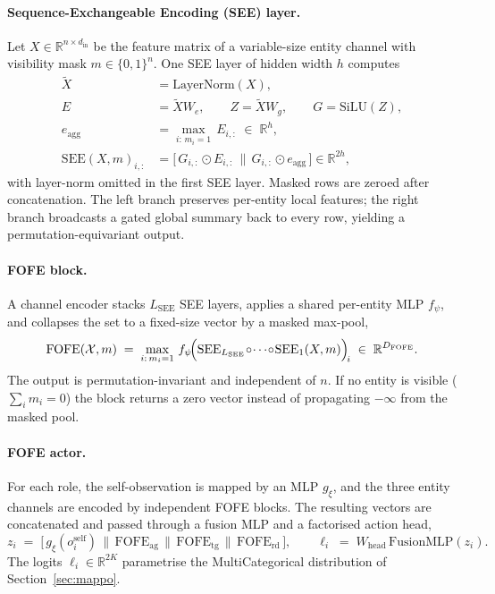 \paragraph{Sequence-Exchangeable Encoding (SEE) layer.}
Let $X\in\mathbb{R}^{n\times d_{\mathrm{in}}}$ be the feature matrix of a
variable-size entity channel with visibility mask
$m\in\{0,1\}^{n}$. One SEE layer of hidden width $h$ computes
\begin{align}
\tilde X &= \mathrm{LayerNorm}(X), \label{eq:see_ln}\\
E &= \tilde X W_e,\qquad Z = \tilde X W_g,\qquad G = \mathrm{SiLU}(Z), \label{eq:see_proj}\\
e_{\mathrm{agg}} &= \max_{i:\,m_i=1}\, E_{i,:}\;\in\;\mathbb{R}^{h}, \label{eq:see_pool}\\
\mathrm{SEE}(X,m)_{i,:} &=
\bigl[\, G_{i,:}\odot E_{i,:}\,\|\,G_{i,:}\odot e_{\mathrm{agg}}\,\bigr]
\in\mathbb{R}^{2h}, \label{eq:see_cat}
\end{align}
with layer-norm omitted in the first SEE layer. Masked rows are zeroed after
concatenation. The left branch preserves per-entity local features; the
right branch broadcasts a gated global summary back to every row, yielding a
permutation-equivariant output.

\paragraph{FOFE block.}
A channel encoder stacks $L_{\mathrm{SEE}}$ SEE layers, applies a shared
per-entity MLP $f_\psi$, and collapses the set to a fixed-size vector by a
masked max-pool,
\begin{equation}
\mathrm{FOFE}(\mathcal{X},m) \;=\;
\max_{i:\,m_i=1}\, f_\psi\!\Bigl(\mathrm{SEE}_{L_{\mathrm{SEE}}}\!\circ\!\cdots\!\circ\!\mathrm{SEE}_{1}(X,m)\Bigr)_{\!i}
\;\in\;\mathbb{R}^{D_{\mathrm{FOFE}}}.
\label{eq:fofe}
\end{equation}
The output is permutation-invariant and independent of $n$. If no entity is
visible ($\sum_i m_i = 0$) the block returns a zero vector instead of
propagating $-\infty$ from the masked pool.

\paragraph{FOFE actor.}
For each role, the self-observation is mapped by an MLP $g_\xi$, and the
three entity channels are encoded by independent FOFE blocks. The resulting
vectors are concatenated and passed through a fusion MLP and a factorised
action head,
\begin{equation}
z_i \;=\; \bigl[\, g_\xi(o_i^{\mathrm{self}})\,\|\,
\mathrm{FOFE}_{\mathrm{ag}}\,\|\,
\mathrm{FOFE}_{\mathrm{tg}}\,\|\,
\mathrm{FOFE}_{\mathrm{rd}}\,\bigr],
\qquad
\boldsymbol{\ell}_i \;=\; W_{\mathrm{head}}\,\mathrm{FusionMLP}(z_i).
\label{eq:fofe_actor}
\end{equation}
The logits $\boldsymbol{\ell}_i\in\mathbb{R}^{2K}$ parametrise the
MultiCategorical distribution of Section~\ref{sec:mappo}.

